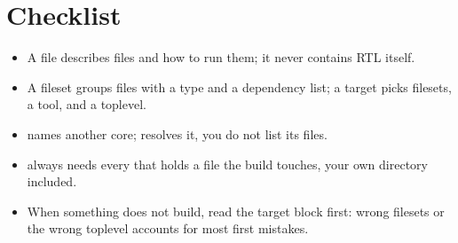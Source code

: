 \section{Checklist}
\label{sec:fusesoc:checklist}

\begin{itemize}
  \item A  file describes files and how to run them; it never
        contains RTL itself.
  \item A fileset groups files with a type and a dependency list; a target
        picks filesets, a tool, and a toplevel.
  \item {} names another core; \FuseSoC resolves it, you do not
        list its files.
  \item {} always needs every  that holds
        a  file the build touches, your own directory included.
  \item When something does not build, read the target block first: wrong
        filesets or the wrong toplevel accounts for most first mistakes.
\end{itemize}
